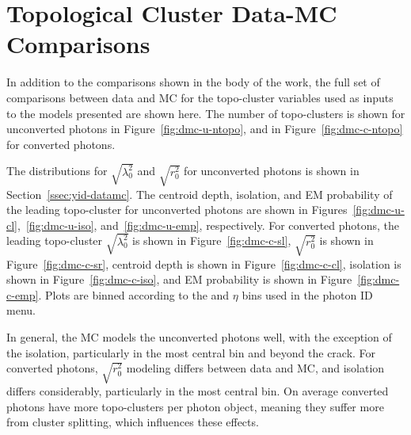 \chapter{Topological Cluster Data-MC Comparisons}\label{app:datamc}

In addition to the comparisons shown in the body of the work, the full set of comparisons between data and \gls{MC} for the topo-cluster variables used as inputs to the models presented are shown here. The number of topo-clusters is shown for unconverted photons in Figure~\ref{fig:dmc-u-ntopo}, and in Figure~\ref{fig:dmc-c-ntopo} for converted photons.

The distributions for $\sqrt{\lambda_{0}^2}$ and $\sqrt{r_{0}^2}$ for unconverted photons is shown in Section~\ref{ssec:yid-datamc}. The centroid depth, isolation, and \gls{EM} probability of the leading topo-cluster for unconverted photons are shown in Figures~\ref{fig:dmc-u-cl},~\ref{fig:dmc-u-iso}, and~\ref{fig:dmc-u-emp}, respectively. For converted photons, the leading topo-cluster $\sqrt{\lambda_{0}^2}$ is shown in Figure~\ref{fig:dmc-c-sl}, $\sqrt{r_{0}^2}$ is shown in Figure~\ref{fig:dmc-c-sr}, centroid depth is shown in Figure~\ref{fig:dmc-c-cl}, isolation is shown in Figure~\ref{fig:dmc-c-iso}, and \gls{EM} probability is shown in Figure~\ref{fig:dmc-c-emp}. Plots are binned according to the \pt and $\eta$ bins used in the photon ID menu.

In general, the \gls{MC} models the unconverted photons well, with the exception of the isolation, particularly in the most central bin and beyond the crack. For converted photons, $\sqrt{r_{0}^2}$ modeling differs between data and \gls{MC}, and isolation differs considerably, particularly in the most central bin. On average converted photons have more topo-clusters per photon object, meaning they suffer more from cluster splitting, which influences these effects.

